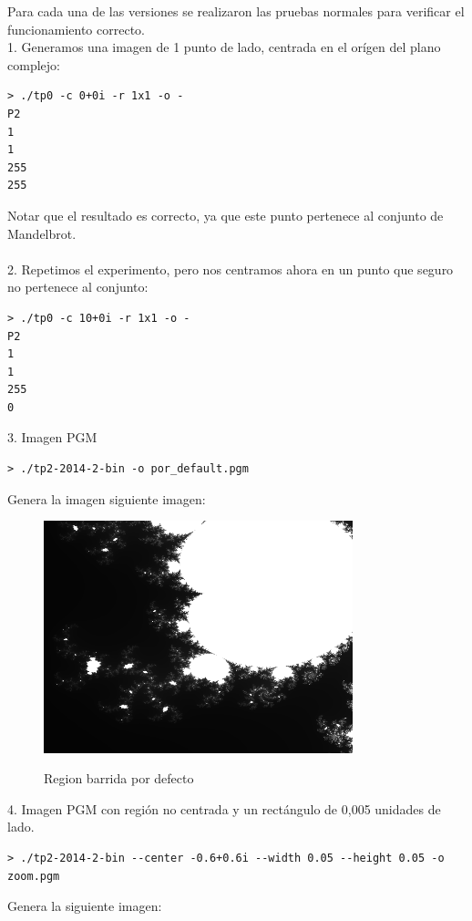 \documentclass[a4paper,10pt]{article}
\begin{document}
Para cada una de las versiones se realizaron las pruebas normales para verificar el funcionamiento correcto.\\

1. Generamos una imagen de 1 punto de lado, centrada en el or\'igen del plano complejo:
\begin{verbatim}
> ./tp0 -c 0+0i -r 1x1 -o -
P2
1
1
255
255
\end{verbatim}

Notar que el resultado es correcto, ya que este punto pertenece al conjunto de Mandelbrot.\\
\\
2. Repetimos el experimento, pero nos centramos ahora en un punto que seguro no pertenece
al conjunto:
\begin{verbatim}
> ./tp0 -c 10+0i -r 1x1 -o -
P2
1
1
255
0
\end{verbatim}

3. Imagen PGM
\begin{verbatim}
> ./tp2-2014-2-bin -o por_default.pgm
\end{verbatim}
Genera la imagen siguiente imagen:

\begin{figure}[H]
\begin{center}
\includegraphics[width=0.8\textwidth]{./porDefecto.png}
\label{fig:def}
\caption{Region barrida por defecto}
\end{center}
\end{figure}


4. Imagen PGM con regi\'on no centrada y un rect\'angulo de 0,005 unidades de lado.
\begin{verbatim}
> ./tp2-2014-2-bin --center -0.6+0.6i --width 0.05 --height 0.05 -o zoom.pgm
\end{verbatim}
Genera la siguiente imagen:
\end{document}
